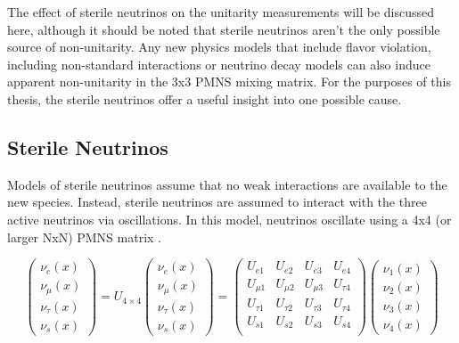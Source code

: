 The effect of sterile neutrinos on the unitarity measurements will be discussed here, although it should be noted that sterile neutrinos aren't the only possible source of non-unitarity.
Any new physics models that include flavor violation, including  non-standard interactions or neutrino decay models can also induce apparent non-unitarity in the 3x3 PMNS mixing matrix.
For the purposes of this thesis, the sterile neutrinos offer a useful insight into one possible cause. 


\subsection{Sterile Neutrinos}
\label{subsec:steriles}
Models of sterile neutrinos assume that no weak interactions are available to the new species.
Instead, sterile neutrinos are assumed to interact with the three active neutrinos via oscillations.
In this model, neutrinos oscillate using a 4x4 (or larger NxN) PMNS matrix \cite{Review-PMNS, GlobalSteriles-2012, GlobalSteriles-2017, Review-LightSterile}.

\begin{equation}
\begin{pmatrix} \nu_e\left(x\right) \\ 	\nu_\mu\left(x\right) \\	\nu_\tau\left(x\right) \\  \nu_s\left(x\right)\end{pmatrix} = 
U_{4\times 4} \begin{pmatrix} \nu_e\left(x\right) \\ 	\nu_\mu\left(x\right) \\	\nu_\tau\left(x\right) \\	\nu_s\left(x\right)\end{pmatrix} = 
\begin{pmatrix}
 U_{e 1} & U_{e 2} & U_{e 3} & U_{e 4} \\
 U_{\mu 1} & U_{\mu 2} & U_{\mu 3} & U_{\tau 4}  \\
 U_{\tau 1} & U_{\tau 2} & U_{\tau 3} & U_{\tau 4}  \\
 U_{s 1} & U_{s 2} & U_{s 3} & U_{s 4}  \\
\end{pmatrix} 	
\begin{pmatrix} \nu_1\left(x\right) \\ 	\nu_2\left(x\right) \\	\nu_3\left(x\right) \\ \nu_4\left(x\right) \end{pmatrix}
\label{eqn:4flavor_pmns}
\end{equation}

